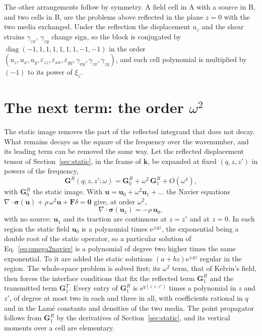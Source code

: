 \documentclass[11pt,a4paper]{article}
\newcommand{\bk}{\mathbf{k}}
\newcommand{\ee}{\mathrm{e}}
\begin{document}
The other arrangements follow by symmetry. A field cell in A with a source in B, and two cells in B, are
the problems above reflected in the plane $z=0$ with the two media exchanged. Under the reflection the
displacement $u_z$ and the shear strains $\gamma_{zx}$, $\gamma_{zy}$ change sign, so the block is conjugated
by $\operatorname{diag}(-1,1,1,1,1,1,1,-1,-1)$ in the order $(u_z,u_x,u_y,\varepsilon_{zz},\varepsilon_{xx},
\varepsilon_{yy},\gamma_{xy},\gamma_{zx},\gamma_{zy})$, and each cell polynomial is multiplied by $(-1)$ to
its power of $\xi_z$.

\section{The next term: the order \texorpdfstring{$\omega^2$}{omega squared}}\label{sec:omega2}

The static image removes the part of the reflected integrand that does not decay. What remains decays as the
square of the frequency over the wavenumber, and its leading term can be removed the same way. Let the
reflected displacement tensor of Section~\ref{sec:static}, in the frame of $\bk$, be expanded at fixed
$(q,z,z')$ in powers of the frequency,
\begin{equation}\label{eq:omegaexpansion}
  \mathbf G^{R}(q;z,z';\omega)=\mathbf G^{R}_0+\omega^2\,\mathbf G^{R}_1+O(\omega^4),
\end{equation}
with $\mathbf G^{R}_0$ the static image. With $\mathbf u=\mathbf u_0+\omega^2\mathbf u_1+\dots$ the Navier
equations $\nabla\cdot\boldsymbol\sigma(\mathbf u)+\rho\,\omega^2\mathbf u+\mathbf F\delta=\mathbf 0$ give, at
order $\omega^2$,
\begin{equation}\label{eq:omega2navier}
  \nabla\cdot\boldsymbol\sigma(\mathbf u_1)=-\rho\,\mathbf u_0,
\end{equation}
with no source: $\mathbf u_1$ and its traction are continuous at $z=z'$ and at $z=0$. In each region the
static field $\mathbf u_0$ is a polynomial times $\ee^{\pm qz}$, the exponential being a double root of the
static operator, so a particular solution of Eq.~\eqref{eq:omega2navier} is a polynomial of degree two higher
times the same exponential. To it are added the static solutions $(a+bz)\ee^{\pm qz}$ regular in the region.
The whole-space problem is solved first; its $\omega^2$ term, that of Kelvin's field, then forces the
interface conditions that fix the reflected term $\mathbf G^{R}_1$ and the transmitted term $\mathbf G^{T}_1$.
Every entry of $\mathbf G^{R}_1$ is $\ee^{q(z+z')}$ times a polynomial in $z$ and $z'$, of degree at most two
in each and three in all, with coefficients rational in $q$ and in the Lam\'e constants and densities of the
two media. The point propagator follows from $\mathbf G^{R}_1$ by the derivatives of
Section~\ref{sec:static}, and its vertical moments over a cell are elementary.
\end{document}
